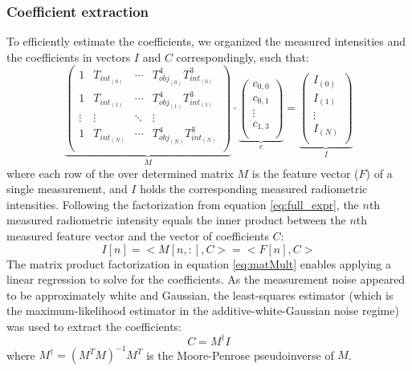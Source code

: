 \subsubsection{Coefficient extraction} \label{sec:coeff_extraction}
To efficiently estimate the coefficients, we organized the measured intensities and the coefficients in vectors $I$ and $C$ correspondingly, such that:
\begin{equation} \label{eq:matMult}
  \underbrace{
    \begin{pmatrix}
      1       & T_\mathit{int_{(0)}}  & \cdots & T_\mathit{obj_{(0)}}^4 T_\mathit{int_{(0)}}^3  \\
      1       & T_\mathit{int_{(1)}}  & \cdots & T_\mathit{obj_{(1)}}^4 T_\mathit{int_{(1)}}^3  \\
      \vdots  & \vdots                & \ddots & \vdots                                         \\
      1       & T_\mathit{int_{(N)}}  & \cdots & T_\mathit{obj_{(N)}}^4 T_\mathit{int_{(N)}}^3  \\  
    \end{pmatrix}  
  }_{M}
  \cdot
  \underbrace{
    \begin{pmatrix}
      c_{0,0} \\
      c_{0,1} \\
      \vdots  \\
      c_{1,3} \\    
    \end{pmatrix}  
  }_{c}
  = 
  \underbrace{
    \begin{pmatrix}
      I_{(0)} \\
      I_{(1)} \\
      \vdots  \\
      I_{(N)} \\    
    \end{pmatrix}  
  }_{I}
\end{equation} %
where each row of the over determined matrix $M$ is the feature vector ($F$) of a single measurement, and $I$
holds the corresponding measured radiometric intensities.
Following the factorization from equation \ref{eq:full_expr}, the $n$th measured radiometric intensity equals the inner product between the $n$th measured feature vector and the vector of coefficients $C$:
\begin{equation}
  I[n] = <M[n, :], C> = <F[n], C>
\end{equation}
The matrix product factorization in equation \ref{eq:matMult} enables applying a linear regression to solve for the coefficients.
As the measurement noise appeared to be approximately white and Gaussian, the least-squares estimator (which is the maximum-likelihood estimator in the additive-white-Gaussian noise regime) was used to extract the coefficients:
\begin{equation} \label{eq:PseudoInverse}
  C = M^{\dagger} I
\end{equation}
where $M^{\dagger} = (M^TM)^{-1}M^T$ is the Moore-Penrose pseudoinverse of $M$.

